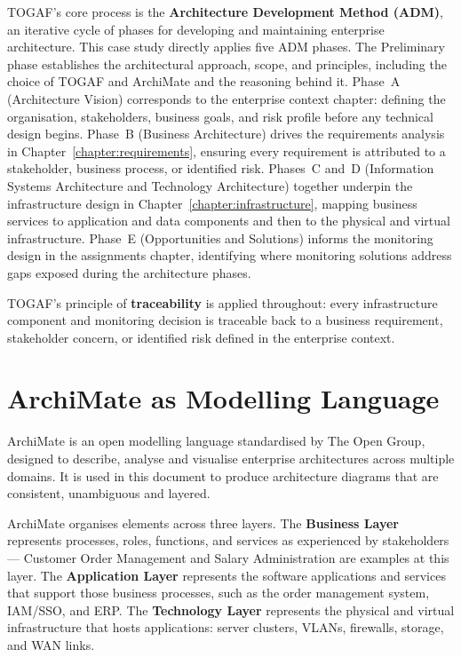 TOGAF's core process is the \textbf{Architecture Development Method (ADM)}, an iterative cycle of phases for developing and maintaining enterprise architecture. \label{tab:adm}This case study directly applies five ADM phases. The Preliminary phase establishes the architectural approach, scope, and principles, including the choice of TOGAF and ArchiMate and the reasoning behind it. Phase~A (Architecture Vision) corresponds to the enterprise context chapter: defining the organisation, stakeholders, business goals, and risk profile before any technical design begins. Phase~B (Business Architecture) drives the requirements analysis in Chapter~\ref{chapter:requirements}, ensuring every requirement is attributed to a stakeholder, business process, or identified risk. Phases~C and~D (Information Systems Architecture and Technology Architecture) together underpin the infrastructure design in Chapter~\ref{chapter:infrastructure}, mapping business services to application and data components and then to the physical and virtual infrastructure. Phase~E (Opportunities and Solutions) informs the monitoring design in the assignments chapter, identifying where monitoring solutions address gaps exposed during the architecture phases.

TOGAF's principle of \textbf{traceability} is applied throughout: every infrastructure component and monitoring decision is traceable back to a business requirement, stakeholder concern, or identified risk defined in the enterprise context.

\section{ArchiMate as Modelling Language}

ArchiMate is an open modelling language standardised by The Open Group, designed to describe, analyse and visualise enterprise architectures across multiple domains. It is used in this document to produce architecture diagrams that are consistent, unambiguous and layered.

ArchiMate organises elements across three layers. The \textbf{Business Layer} represents processes, roles, functions, and services as experienced by stakeholders --- Customer Order Management and Salary Administration are examples at this layer. The \textbf{Application Layer} represents the software applications and services that support those business processes, such as the order management system, IAM/SSO, and ERP. The \textbf{Technology Layer} represents the physical and virtual infrastructure that hosts applications: server clusters, VLANs, firewalls, storage, and WAN links.

